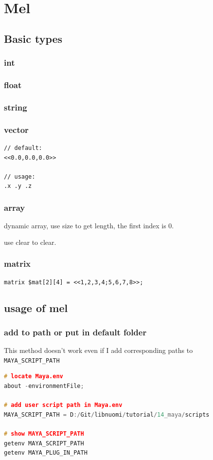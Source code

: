 
\chapter{Mel}

\section{Basic types}
\subsection{int}

\subsection{float}

\subsection{string}

\subsection{vector}

\begin{lstlisting}
// default:
<<0.0,0.0,0.0>> 

// usage:
.x .y .z
\end{lstlisting}

\subsection{array}
dynamic array, use size to get length, the first index is 0.

use clear to clear.

\subsection{matrix}

\begin{lstlisting}
matrix $mat[2][4] = <<1,2,3,4;5,6,7,8>>;
\end{lstlisting}

\section{usage of mel}

\subsection{add to path or put in default folder}
This method doesn't work even if I add corresponding paths to \lstinline|MAYA_SCRIPT_PATH|
\begin{lstlisting}[language=C++]
# locate Maya.env
about -environmentFile;

# add user script path in Maya.env
MAYA_SCRIPT_PATH = D:/Git/libnuomi/tutorial/14_maya/scripts

# show MAYA_SCRIPT_PATH
getenv MAYA_SCRIPT_PATH
getenv MAYA_PLUG_IN_PATH
\end{lstlisting}

